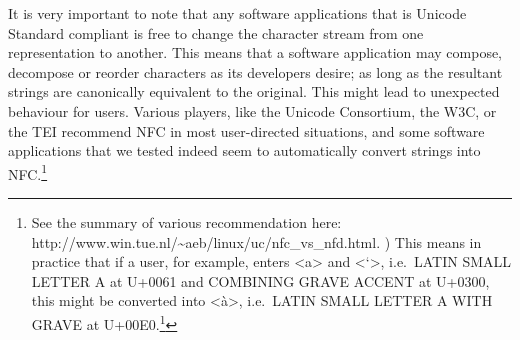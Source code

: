 {{{{{{{{{{{{{{{{{{{{{{{{{{{It is very important to note that any software applications that is Unicode Standard compliant is free to change the character stream from one representation to another. This means that a software application may compose, decompose or reorder characters as its developers desire; as long as the resultant strings are canonically equivalent to the original. This might lead to unexpected behaviour for users. Various players, like the Unicode Consortium, the W3C, or the TEI recommend NFC in most user-directed situations, and some software applications that we tested indeed seem to automatically convert strings into NFC.\footnote{See the summary of various recommendation here: http://www.win.tue.nl/\textasciitilde{}aeb/linux/uc/nfc\_vs\_nfd.html. ) This means in practice that if a user, for example, enters <a> and <`>, i.e.~LATIN SMALL LETTER A at U+0061 and COMBINING GRAVE ACCENT at U+0300, this might be converted into <à>, i.e.~LATIN SMALL LETTER A WITH GRAVE at U+00E0.\footnote{The behaviour of software applications can be quite erratic in this respect. For example, Apple's TextEdit does not do any conversion on text entry. However, when you copy and paste some text inside the same document in ``rich text mode'' (i.e.~RTF-format), it will be transformed into NFC on paste. Saving a document does not do any conversion to the glyphs on screen, but it will save the characters in NFC.)

\subsection{Pitfall: Characters are not glyphs}\label{pitfall-characters-are-not-glyphs}

A central principle of Unicode is the distinction between character and glyph. A character is the abstract notion of a symbol in a writing system, while a glyph is the concrete drawing of such a symbol. In practice, there is a complex interaction between characters and glyphs. A single Unicode character may of course be rendered as a single glyph. However, a character may also be a `piece' of a glyph, or vice-versa. Actually, all possible relations between glyphs and characters are attested.

}}}}}}}}}}}}}}}}}}}}}}}}}}}}}
